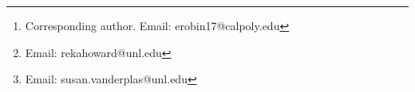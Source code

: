 \author[1]{Emily A. Robinson\thanks{Corresponding author. Email: erobin17@calpoly.edu}}
\author[2]{Reka Howard\footnote{Email: rekahoward@unl.edu}}
\author[2]{Susan VanderPlas\footnote{Email: susan.vanderplas@unl.edu}}
